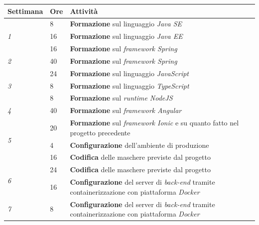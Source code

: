\begin{table}[h]
  \label{tab:attivita-settimanali}
  \begin{tabularx}{\textwidth}{|l|l|X|}
  \hline
  \textbf{Settimana}          & \textbf{Ore} & \textbf{Attività}         \\ \hline
  \multirow{3}{*}{\textit{1}} & 8            & \textbf{Formazione} sul linguaggio \textit{Java SE}  \\ \cline{2-3}
                              & 16           & \textbf{Formazione} sul linguaggio \textit{Java EE}  \\ \cline{2-3}
                              & 16           & \textbf{Formazione} sul \textit{framework Spring}    \\ \hline
  \textit{2}                  & 40           & \textbf{Formazione} sul \textit{framework Spring}                    \\ \hline
  \multirow{3}{*}{\textit{3}} & 24           & \textbf{Formazione} sul linguaggio \textit{JavaScript}                        \\ \cline{2-3}
                              & 8            & \textbf{Formazione} sul linguaggio \textit{TypeScript}                        \\ \cline{2-3}
                              & 8            & \textbf{Formazione} sul \textit{runtime NodeJS}                     \\ \hline
  \textit{4}                  & 40           & \textbf{Formazione} sul \textit{framework Angular}                   \\ \hline
  \multirow{3}{*}{\textit{5}} & 20           & \textbf{Formazione} sul \textit{framework Ionic} e su quanto fatto nel progetto precedente \\ \cline{2-3}
                              & 4            & \textbf{Configurazione} dell'ambiente di produzione            \\ \cline{2-3}
                              & 16           & \textbf{Codifica} delle maschere previste dal progetto  \\ \hline
  \multirow{2}{*}{\textit{6}} & 24           & \textbf{Codifica} delle maschere previste dal progetto  \\ \cline{2-3}
                              & 16           & \textbf{Configurazione} del server di \textit{back-end} tramite containerizzazione con piattaforma \textit{Docker}                   \\ \hline
  \textit{7}                  & 8            & \textbf{Configurazione} del server di \textit{back-end} tramite containerizzazione con piattaforma \textit{Docker}           \\ \hline

\end{tabularx}
\end{table}

